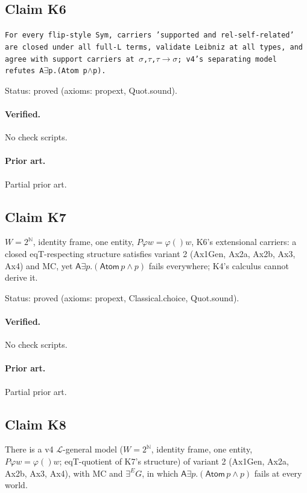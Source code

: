 \documentclass{article}
\begin{document}
\subsection*{Claim K6}

\texttt{For every flip-style Sym, carriers 'supported and rel-self-related' are closed under all full-L terms, validate Leibniz at all types, and agree with support carriers at $\sigma$,$\tau$,$\tau$$\to$$\sigma$; v4's separating model refutes A$\exists$p.(Atom p$\wedge$p).}

Status: proved (axioms: propext, Quot.sound).

\paragraph{Verified.}
No check scripts.

\paragraph{Prior art.} Partial prior art.

\subsection*{Claim K7}

$W=2^{\mathbb N}$, identity frame, one entity, $P\varphi w=\varphi()w$, K6's extensional carriers: a closed eqT-respecting structure satisfies variant 2 (Ax1Gen, Ax2a, Ax2b, Ax3, Ax4) and MC, yet $\mathsf A\exists p.(\mathsf{Atom}\,p\wedge p)$ fails everywhere; K4's calculus cannot derive it.

Status: proved (axioms: propext, Classical.choice, Quot.sound).

\paragraph{Verified.}
No check scripts.

\paragraph{Prior art.} Partial prior art.

\subsection*{Claim K8}

There is a v4 $\mathcal L$-general model ($W=2^{\mathbb N}$, identity frame, one entity, $P\varphi w=\varphi()w$; eqT-quotient of K7's structure) of variant 2 (Ax1Gen, Ax2a, Ax2b, Ax3, Ax4), with MC and $\exists^E G$, in which $\mathsf A\exists p.(\mathsf{Atom}\,p\wedge p)$ fails at every world.
\end{document}
